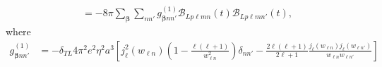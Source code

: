 \documentclass{article}
\begin{document}
\begin{equation}
\begin{split}
&
= -8\pi\sum_{\bm{\beta}}\sum_{nn'}g_{\bm{\beta}nn'}^{(1)}\mathcal{B}_{Lp\ell mn}(t)\mathcal{B}_{Lp\ell mn'}(t),
\end{split}
\end{equation}
where
\begin{equation}
\begin{split}
g_{\bm{\beta}nn'}^{(1)} 
&= -\delta_{TL}4\pi^2e^2\eta^2a^3\left[j_\ell^2(w_{\ell n})\left(1 - \frac{\ell(\ell + 1)}{w_{\ell n}^2}\right)\delta_{nn'} - \frac{2\ell(\ell + 1)}{2\ell + 1}\frac{j_\ell(w_{\ell n})j_\ell(w_{\ell n'})}{w_{\ell n}w_{\ell n'}}\right]
\end{split}
\end{equation}
\end{document}
